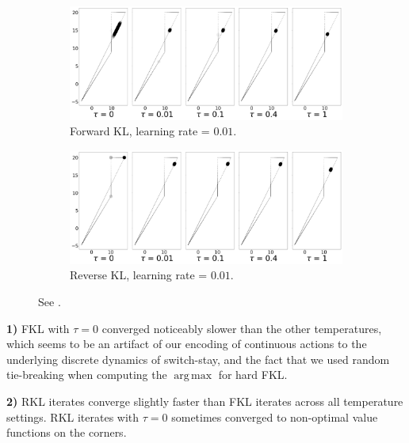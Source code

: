 \documentclass[twoside,11pt]{article}
\DeclareMathOperator*{\argmax}{arg\,max}
\begin{document}
\begin{figure}[!htb]
    \centering
    \begin{subfigure}{0.7\linewidth}
    \centering
    \includegraphics[width=\columnwidth]{figs/continuous-switch-stay/notlearnQ/polytope_forward_optim=rmsprop_lr=0.01.png}
    \caption{Forward KL, learning rate = $0.01$.}
    \label{fig:cont-switch-stay-forward-0.01}
  \end{subfigure}%

  \begin{subfigure}[b]{0.7\linewidth}
        \centering
        \includegraphics[width=\columnwidth]{figs/continuous-switch-stay/notlearnQ/polytope_reverse_optim=rmsprop_lr=0.01.png}
        \caption{Reverse KL, learning rate = $0.01$.}
        \label{fig:cont-switch-stay-reverse-0.01}
  \end{subfigure}
  \caption{See .}
  \label{fig:cont-ss-poly-0.01}
\end{figure}

\textbf{1)} FKL with $\tau = 0$ converged noticeably slower than the other temperatures, which seems to be an artifact of our encoding of continuous actions to the underlying discrete dynamics of switch-stay, and the fact that we used random tie-breaking when computing the $\argmax$ for hard FKL. 

\textbf{2)} RKL iterates converge slightly faster than FKL iterates across all temperature settings. RKL iterates with $\tau = 0$ sometimes converged to non-optimal value functions on the corners. 
\end{document}
